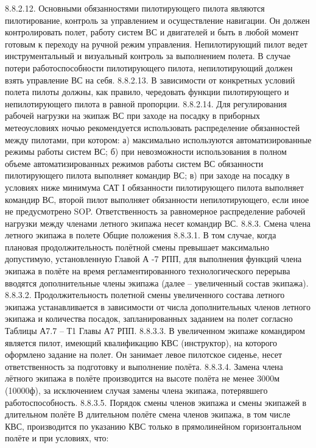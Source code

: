 8.8.2.12. Основными обязанностями пилотирующего пилота являются пилотирование, контроль за управлением и осуществление навигации. Он должен контролировать полет, работу систем ВС и двигателей и быть в любой момент готовым к переходу на ручной режим управления. 
Непилотирующий пилот ведет инструментальный и визуальный контроль за выполнением полета. В случае потери работоспособности пилотирующего пилота, непилотирующий должен взять управление ВС на себя.
8.8.2.13. В зависимости от конкретных условий полета пилоты должны, как правило, чередовать функции пилотирующего и непилотирующего пилота в равной пропорции.
8.8.2.14. Для регулирования рабочей нагрузки на экипаж ВС при заходе на посадку в приборных метеоусловиях ночью рекомендуется использовать распределение обязанностей между пилотами, при котором: 
а)	максимально используются автоматизированные режимы работы систем ВС;
б)	при невозможности использования в полном объеме автоматизированных режимов работы систем ВС обязанности пилотирующего пилота выполняет командир ВС;
в)	при заходе на посадку в условиях ниже минимума САТ I обязанности пилотирующего пилота выполняет командир ВС, второй пилот выполняет обязанности непилотирующего, если иное не предусмотрено SOP.
Ответственность за равномерное распределение рабочей нагрузки между членами летного экипажа несет командир ВС.
8.8.3. Смена члена летного экипажа в полете
Общие положения
8.8.3.1. В том случае, когда плановая продолжительность полётной смены превышает максимально допустимую, установленную Главой А -7 РПП, для выполнения функций члена экипажа в полёте на время регламентированного технологического перерыва вводятся дополнительные члены экипажа (далее – увеличенный состав экипажа).
8.8.3.2. Продолжительность полетной смены увеличенного состава летного экипажа устанавливается в зависимости от числа дополнительных членов летного экипажа и количества посадок, запланированных заданием на полет согласно Таблицы А7.7 – Т1 Главы А7 РПП.
8.8.3.3. В увеличенном экипаже командиром является пилот, имеющий квалификацию КВС (инструктор), на которого оформлено задание на полет. Он занимает левое пилотское сиденье, несет ответственность за подготовку и выполнение полёта.
8.8.3.4. Замена члена лётного экипажа в полёте производится на высоте полёта не менее 3000м (10000ф), за исключением случая замены члена экипажа, потерявшего работоспособность.
8.8.3.5. Порядок смены членов экипажа и смены экипажей в длительном полёте
В длительном полёте смена членов экипажа, в том числе КВС, производится по указанию КВС только в прямолинейном горизонтальном полёте и при условиях, что:
